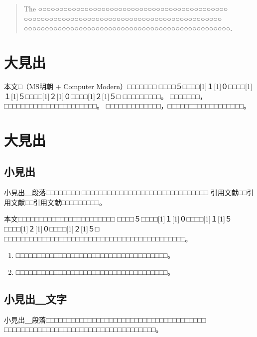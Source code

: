 \documentclass[platex,fleqn]{ieej-tec2}%
\begin{document}
%
\begin{abstract}
The ○○○○○○○○○○○○○○○○○○○○○○○○○○○○○○○○○○○○○○○○○○○○○
○○○○○○○○○○○○○○○○○○○○○○○○○○○○○○○○○○○○○○○○○○○○○○○
○○○○○○○○○○○○○○○○○○○○○○○○○○○○○○○○○○○○○○○○○○○○○○○○○.
\end{abstract}
\maketitle
%
%
\section{大見出}
本文□（MS明朝 $+$ Computer Modern）□□□□□□□
□□□□５□□□□\scalebox{0.5}[1]{１}\scalebox{0.5}[1]{０}□□□□\scalebox{0.5}[1]{１}\scalebox{0.5}[1]{５}□□□□\scalebox{0.5}[1]{２}\scalebox{0.5}[1]{０}□□□□\scalebox{0.5}[1]{２}\scalebox{0.5}[1]{５}□
□□□□□□□□□。
□□□□□□□，□□□□□□□□□□□□□□□□□□□□□□。
□□□□□□□□□□□□□，□□□□□□□□□□□□□□□□□□。

\section{大見出}

\subsection{小見出}
小見出＿段落□□□□□□□□
□□□□□□□□□□□□□□□□□□□□□□□□□□□□□□
引用文献\cite{IEEJformat}□□引用文献\cite{bib2,bib3}□□引用文献\cite{bib4,bib5,bib6,bib7}□□□□□□□□□。

本文□□□□□□□□□□□□□□□□□□□□□□□
□□□□５□□□□\scalebox{0.5}[1]{１}\scalebox{0.5}[1]{０}□□□□\scalebox{0.5}[1]{１}\scalebox{0.5}[1]{５}□□□□\scalebox{0.5}[1]{２}\scalebox{0.5}[1]{０}□□□□\scalebox{0.5}[1]{２}\scalebox{0.5}[1]{５}□
□□□□□□□□□□□□□□□□□□□□□□□□□□□□□□□□□□□□□□□□□□□。
\begin{enumerate}
\item
□□□□□□□□□□□□□□□□□□□□□□□□□□□□□□□□□□□□。
\item
□□□□□□□□□□□□□□□□□□□□□□□□□□□□□□□□□□□□。
\end{enumerate}

\subsection{小見出＿文字}
小見出＿段落□□□□□□□□□□□□□□□□□□□□□□□□□□□□□□□□□□□□□□
□□□□□□□□□□□□□□□□□□□□□□□□□□□□□□□□□□□□。
\end{document}
